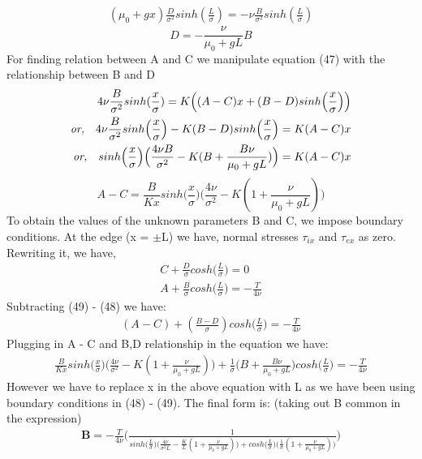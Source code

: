 \documentclass[a4paper,oneside,11pt]{report}
\begin{document}
\begin{align*}
(\mu_0 + gx)\frac{D}{\sigma^2}sinh(\frac{L}{\sigma}) = -\nu\frac{B}{\sigma^2}sinh(\frac{L}{\sigma})
\end{align*}
\[\boxed{
D = -\frac{\nu}{\mu_0 + gL} B
}
\]
For finding relation between A and C we manipulate equation (47) with the relationship between B and D
\begin{align*}
4\nu\frac{B}{\sigma^2}sinh(\frac{x}{\sigma}) = K \Big ( (A - C)x + (B - D)sinh\Big ( \frac{x}{\sigma} \Big )\Big )\\
\textit{or,} \hspace{0.35cm} 4\nu\frac{B}{\sigma^2}sinh\Big (\frac{x}{\sigma} \Big ) - K (B - D)sinh\Big ( \frac{x}{\sigma} \Big ) = K (A - C)x \\
\textit{or,} \hspace{0.35cm} sinh \Big( \frac{x}{\sigma}\Big ) \Big( \frac{4\nu B}{\sigma^2 } - K(B + \frac{B\nu}{\mu_0 + gL}) \Big ) = K (A - C)x 
\end{align*}
\[\boxed{
A - C = \frac{B}{Kx} sinh \Big( \frac{x}{\sigma}\Big ) \Big( \frac{4\nu }{\sigma^2 } - K(1+ \frac{\nu}{\mu_0 + gL}) \Big )
}
\]
To obtain the values of the unknown parameters B and C, we impose boundary conditions. At the edge (x = $\pm$L) we have, normal stresses $\tau_{ix}$ and $\tau_{ex}$ as zero. Rewriting it, we have,
\begin{align}
C + \frac{D}{\sigma}cosh\Big ( \frac{L}{\sigma} \Big ) = 0\\
A + \frac{B}{\sigma}cosh\Big ( \frac{L}{\sigma} \Big ) = -\frac{T}{4\nu}
\end{align}
Subtracting (49) - (48) we have: 
\begin{align}
(A - C) + (\frac{B - D}{\sigma})cosh\Big ( \frac{L}{\sigma} \Big ) = -\frac{T}{4\nu}
\end{align}
Plugging in A - C and B,D relationship in the equation we have: 
\begin{align*}
\frac{B}{Kx} sinh \Big( \frac{x}{\sigma}\Big ) \Big( \frac{4\nu }{\sigma^2 } - K(1+ \frac{\nu}{\mu_0 + gL}) \Big ) + \frac{1}{\sigma}\Big (B + \frac{B\nu}{\mu_0 + gL}\Big )cosh\Big ( \frac{L}{\sigma} \Big ) = -\frac{T}{4\nu}
\end{align*}
However we have to replace x in the above equation with L as we have been using boundary conditions in (48) - (49). The final form is: (taking out B common in the expression)
\begin{align}
\textbf{B} = -\frac{T}{4\nu} \Bigg ( \frac{1}{sinh \Big( \frac{L}{\sigma}\Big ) \Big ( \frac{4\nu}{\sigma^2 L} - \frac{K}{L} (1+ \frac{\nu}{\mu_0 + gL}) \Big ) + cosh\Big ( \frac{L}{\sigma} \Big ) \Big (  \frac{1}{\sigma} (1+ \frac{\nu}{\mu_0 + gL}) \Big )} \Bigg)
\end{align}
\end{document}
